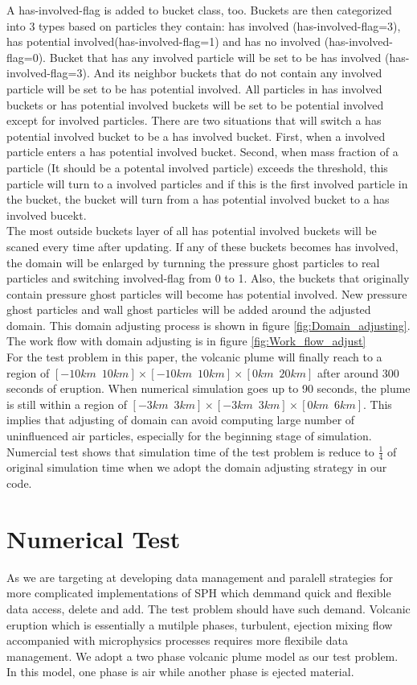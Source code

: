 \documentclass[conference,compsoc]{IEEEtran}
\begin{document}
A has-involved-flag is added to bucket class, too. Buckets are then categorized into 3 types based on particles they contain: has involved (has-involved-flag=3), has potential involved(has-involved-flag=1) and has no involved (has-involved-flag=0). Bucket that has any involved particle will be set to be has involved (has-involved-flag=3). And its neighbor buckets that do not contain any involved particle will be set to be has potential involved. 
All particles in has involved buckets or has potential involved buckets will be set to be potential involved except for involved particles. There are two situations that will switch a has potential involved bucket to be a has involved bucket. First, when a involved particle enters a has potential involved bucket. Second, when mass fraction of a particle (It should be a potental involved particle) exceeds the threshold, this particle will turn to a involved particles and if this is the first involved particle in the bucket, the bucket will turn from a has potential involved bucket to a has involved bucekt.\\
The most outside buckets layer of all has potential involved buckets will be scaned every time after updating. If any of these buckets becomes has involved, the domain will be enlarged by turnning the pressure ghost particles to real particles and switching involved-flag from 0 to 1. Also, the buckets that originally contain pressure ghost particles will become has potential involved. New pressure ghost particles and wall ghost particles will be added around the adjusted domain.
This domain adjusting process is shown in figure \ref{fig:Domain_adjusting}.
The work flow with domain adjusting is in figure \ref{fig:Work_flow_adjust}\\
For the test problem in this paper, the volcanic plume will finally reach to a region of $[-10km \,\,\, 10km] \times [-10km\,\,\,10km] \times [0km\,\,\,20km]$ after around 300 seconds of eruption. When numerical simulation goes up to 90 seconds, the plume is still within a region of $[-3km\,\,\,3km] \times [-3km\,\,\,3km] \times [0km\,\,\,6km]$. This implies that adjusting of domain can avoid computing large number of uninfluenced air particles, especially for the beginning stage of simulation. Numercial test shows that simulation time of the test problem is reduce to $\frac{1}{4}$ of original simulation time when we adopt the domain adjusting strategy in our code.
\section{Numerical Test}
As we are targeting at developing data management and paralell strategies for more complicated implementations of SPH which demmand quick and flexible data access, delete and add. The test problem should have such demand. Volcanic eruption which is essentially a mutilple phases, turbulent, ejection mixing flow accompanied with microphysics processes requires more flexibile data management. We adopt a two phase volcanic plume model\cite{suzuki2005numerical} as our test problem. In this model, one phase is air while another phase is ejected material.
\end{document}
